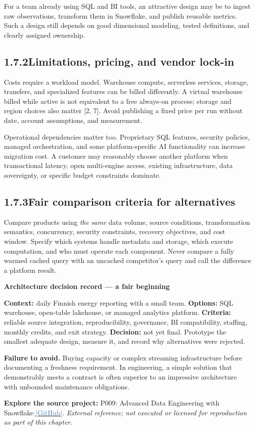 \documentclass[11pt,twoside]{article}
\newcommand{\topic}[2]{\subsection*{#1\quad #2}}
\newcommand{\repo}[2]{\par\begingroup\small\sffamily\color{inkgray}\textbf{Explore the source project:} #1\,\href{#2}{\,\textcolor{steelblue}{[GitHub]}}. \textit{External reference; not executed or licensed for reproduction as part of this chapter.}\par\endgroup}
\begin{document}
For a team already using SQL and BI tools, an attractive design may be to ingest raw observations, transform them in Snowflake, and publish reusable metrics. Such a design still depends on good dimensional modeling, tested definitions, and clearly assigned ownership.

\topic{1.7.2}{Limitations, pricing, and vendor lock-in}
Costs require a workload model. Warehouse compute, serverless services, storage, transfers, and specialized features can be billed differently. A virtual warehouse billed while active is not equivalent to a free always-on process; storage and region choices also matter [2, 7]. Avoid publishing a fixed price per run without date, account assumptions, and measurement.

Operational dependencies matter too. Proprietary SQL features, security policies, managed orchestration, and some platform-specific AI functionality can increase migration cost. A customer may reasonably choose another platform when transactional latency, open multi-engine access, existing infrastructure, data sovereignty, or specific budget constraints dominate.

\topic{1.7.3}{Fair comparison criteria for alternatives}
Compare products using \emph{the same} data volume, source conditions, transformation semantics, concurrency, security constraints, recovery objectives, and cost window. Specify which systems handle metadata and storage, which execute computation, and who must operate each component. Never compare a fully warmed cached query with an uncached competitor's query and call the difference a platform result.

\begin{insight}
\textbf{Architecture decision record — a fair beginning}\par
\textbf{Context:} daily Finnish energy reporting with a small team. \textbf{Options:} SQL warehouse, open-table lakehouse, or managed analytics platform. \textbf{Criteria:} reliable source integration, reproducibility, governance, BI compatibility, staffing, monthly credits, and exit strategy. \textbf{Decision:} not yet final. Prototype the smallest adequate design, measure it, and record why alternatives were rejected.
\end{insight}

\textbf{Failure to avoid.} Buying capacity or complex streaming infrastructure before documenting a freshness requirement. In engineering, a simple solution that demonstrably meets a contract is often superior to an impressive architecture with unbounded maintenance obligations.
\repo{P009: Advanced Data Engineering with Snowflake}{https://github.com/Snowflake-Labs/advanced-data-engineering-snowflake}
\end{document}
